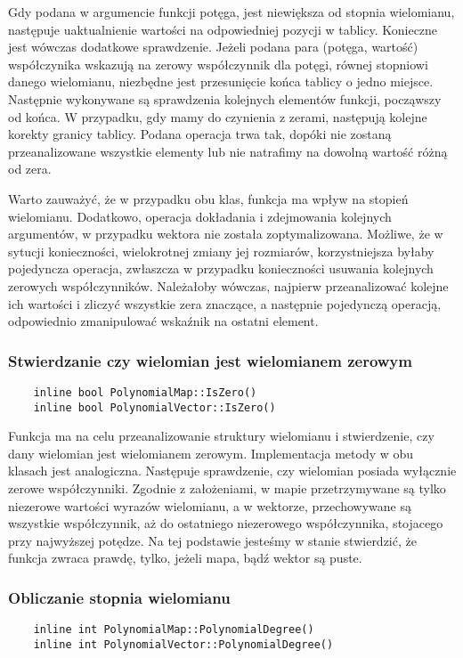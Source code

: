 \documentclass[oneside,a4paper]{book}
\begin{document}
	Gdy podana w argumencie funkcji potęga, jest niewiększa od stopnia wielomianu, następuje uaktualnienie wartości na odpowiedniej pozycji w tablicy. Konieczne jest wówczas dodatkowe sprawdzenie. Jeżeli podana para (potęga, wartość) współczynika wskazują na zerowy współczynnik dla potęgi, równej stopniowi danego wielomianu, niezbędne jest przesunięcie końca tablicy o jedno miejsce. Następnie wykonywane są sprawdzenia kolejnych elementów funkcji, począwszy od końca. W przypadku, gdy mamy do czynienia z zerami, następują kolejne korekty granicy tablicy. Podana operacja trwa tak, dopóki nie zostaną przeanalizowane wszystkie elementy lub nie natrafimy na dowolną wartość różną od zera.
	
	Warto zauważyć, że w przypadku obu klas, funkcja ma wpływ na stopień wielomianu. Dodatkowo, operacja dokładania i zdejmowania kolejnych argumentów, w przypadku wektora nie została zoptymalizowana. Możliwe, że w sytucji konieczności, wielokrotnej zmiany jej rozmiarów, korzystniejsza byłaby pojedyncza operacja, zwłaszcza w przypadku konieczności usuwania kolejnych zerowych współczynników. Należałoby wówczas, najpierw przeanalizować kolejne ich wartości i zliczyć wszystkie zera znaczące, a następnie pojedynczą operacją, odpowiednio zmanipulować wskaźnik na ostatni element.
	\\
	
	\subsubsection{Stwierdzanie czy wielomian jest wielomianem zerowym}
	\begin{lstlisting}
	inline bool PolynomialMap::IsZero()
	inline bool PolynomialVector::IsZero()
	\end{lstlisting}
	
	Funkcja ma na celu przeanalizowanie struktury wielomianu i stwierdzenie, czy dany wielomian jest wielomianem zerowym. Implementacja metody w obu klasach jest analogiczna. Następuje sprawdzenie, czy wielomian posiada wyłącznie zerowe współczynniki. Zgodnie z założeniami, w mapie przetrzymywane są tylko niezerowe wartości wyrazów wielomianu, a w wektorze, przechowywane są wszystkie współczynnik, aż do ostatniego niezerowego współczynnika, stojacego przy najwyższej potędze. Na tej podstawie jesteśmy w stanie stwierdzić, że funkcja zwraca prawdę, tylko, jeżeli mapa, bądź wektor są puste.
	\\
	
	\subsubsection{Obliczanie stopnia wielomianu}
	\begin{lstlisting}
	inline int PolynomialMap::PolynomialDegree()
	inline int PolynomialVector::PolynomialDegree()
	\end{lstlisting}
	
\end{document}
